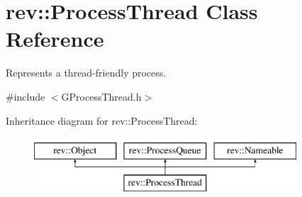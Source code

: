 \hypertarget{classrev_1_1_process_thread}{}\section{rev\+::Process\+Thread Class Reference}
\label{classrev_1_1_process_thread}


Represents a thread-\/friendly process.  




{\ttfamily \#include $<$G\+Process\+Thread.\+h$>$}

Inheritance diagram for rev\+::Process\+Thread\+:\begin{figure}[H]
\begin{center}
\leavevmode
\includegraphics[height=2.000000cm]{classrev_1_1_process_thread}
\end{center}
\end{figure}
